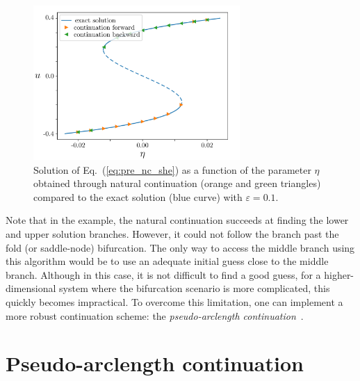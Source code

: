 \begin{exmp}
    \begin{figure}[h]
        \centering
        \includegraphics[width=0.7\textwidth]{scripts/figures/natural_continuation_she.png}
        \caption[short]{Solution of Eq.~(\ref{eq:pre_nc_she}) as a function of the parameter $\eta$ obtained
        through natural continuation (orange and green triangles) compared to the exact solution (blue curve)
        with $\varepsilon = 0.1$.}
        \label{fig:pre_nc_she}
    \end{figure}
\end{exmp}

Note that in the example, the natural continuation succeeds at finding the lower and upper 
solution branches. However, it could not follow the branch past the fold 
(or saddle-node) bifurcation. The only way to access the middle branch using 
this algorithm would be to use an adequate initial guess close
to the middle branch. 
Although in this case, it is not difficult to find a good guess, 
for a higher-dimensional system where the
bifurcation scenario is more complicated, 
this quickly becomes impractical. To overcome this limitation,
one can implement a more robust continuation scheme: 
the {\em pseudo-arclength continuation}~\cite{keller1977numerical}.

\section{Pseudo-arclength continuation}


